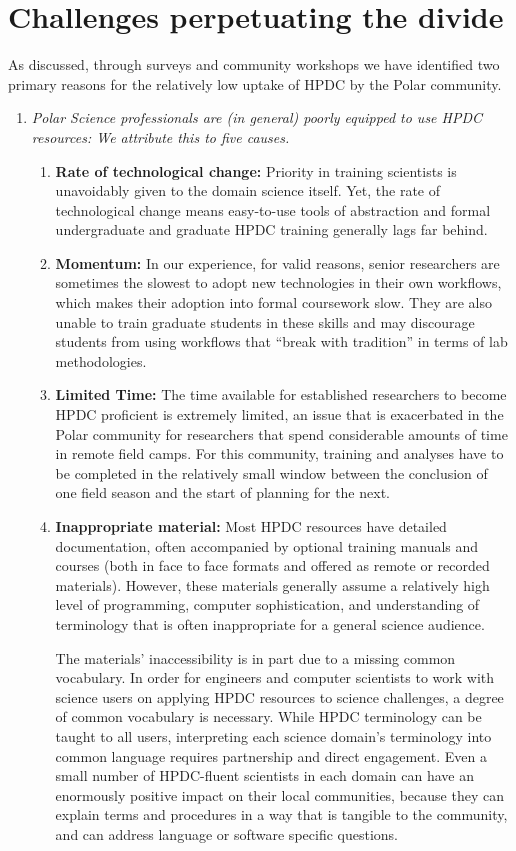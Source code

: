 \documentclass[conference]{IEEEtran}
\begin{document}
\section{Challenges perpetuating the divide}
As discussed, through surveys and community workshops we have identified two primary reasons for the relatively low uptake of HPDC by the Polar community.  

\begin{enumerate}[\setlength{\listparindent}{\parindent}]
\item \textit{Polar Science professionals are (in general) poorly equipped to use HPDC resources:
We attribute this to five causes.}
\begin{enumerate}
\item \textbf{Rate of technological change:} Priority in training scientists is unavoidably given to the domain science itself. Yet, the rate of technological change means easy-to-use tools of abstraction and formal undergraduate and graduate HPDC training generally lags far behind. 
\item \textbf{Momentum: } In our experience, for valid reasons, senior researchers are sometimes the slowest to adopt new technologies in their own workflows, which makes their adoption into formal coursework slow. They are also unable to train graduate students in these skills and may discourage students from using workflows that ``break with tradition'' in terms of lab methodologies.
\item \textbf{Limited Time: }The time available for established researchers to become HPDC proficient is extremely limited, an issue that is exacerbated in the Polar community for researchers that spend considerable amounts of time in remote field camps. For this community, training and analyses have to be completed in the relatively small window between the conclusion of one field season and the start of planning for the next. 
\item \textbf{Inappropriate material: }Most HPDC resources have detailed documentation, often accompanied by optional training manuals and courses (both in face to face formats and offered as remote or recorded materials). However, these materials generally assume a relatively high level of programming, computer sophistication, and understanding of terminology that is often inappropriate for a general science audience.  

The materials' inaccessibility is in part due to a missing common vocabulary. In order for engineers and computer scientists to work with science users on applying HPDC resources to science challenges, a degree of common vocabulary is necessary. While HPDC terminology can be taught to all users, interpreting each science domain's terminology into common language requires partnership and direct engagement. Even a small number of HPDC-fluent scientists in each domain can have an enormously positive impact on their local communities, because they can explain terms and procedures in a way that is tangible to the community, and can address language or software specific questions.


\end{enumerate}
\end{enumerate}
\end{document}
